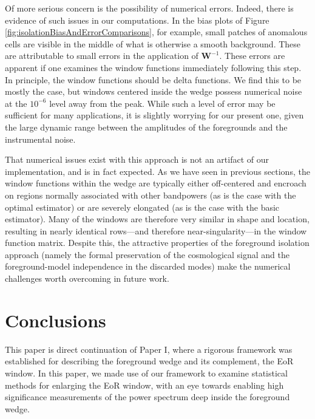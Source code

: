 \documentclass[twocolumn,aps,prd,nofootinbib,showpacs]{revtex4-1}
\begin{document}
Of more serious concern is the possibility of numerical errors.  Indeed, there is evidence of such issues in our computations.  In the bias plots of Figure \ref{fig:isolationBiasAndErrorComparisons}, for example, small patches of anomalous cells are visible in the middle of what is otherwise a smooth background.  These are attributable to small errors in the application of $\mathbf{W}^{-1}$.  These errors are apparent if one examines the window functions immediately following this step.  In principle, the window functions should be delta functions.  We find this to be mostly the case, but windows centered inside the wedge possess numerical noise at the $10^{-6}$ level away from the peak.  While such a level of error may be sufficient for many applications, it is slightly worrying for our present one, given the large dynamic range between the amplitudes of the foregrounds and the instrumental noise.

That numerical issues exist with this approach is not an artifact of our implementation, and is in fact expected.  As we have seen in previous sections, the window functions within the wedge are typically either off-centered and encroach on regions normally associated with other bandpowers (as is the case with the optimal estimator) or are severely elongated (as is the case with the basic estimator).  Many of the windows are therefore very similar in shape and location, resulting in nearly identical rows---and therefore near-singularity---in the window function matrix.  Despite this, the attractive properties of the foreground isolation approach (namely the formal preservation of the cosmological signal and the foreground-model independence in the discarded modes) make the numerical challenges worth overcoming in future work.

\section{Conclusions}
\label{sec:Conclusions}
This paper is direct continuation of Paper I, where a rigorous framework was established for describing the foreground wedge and its complement, the EoR window.  In this paper, we made use of our framework to examine statistical methods for enlarging the EoR window, with an eye towards enabling high significance measurements of the power spectrum deep inside the foreground wedge.
\end{document}
